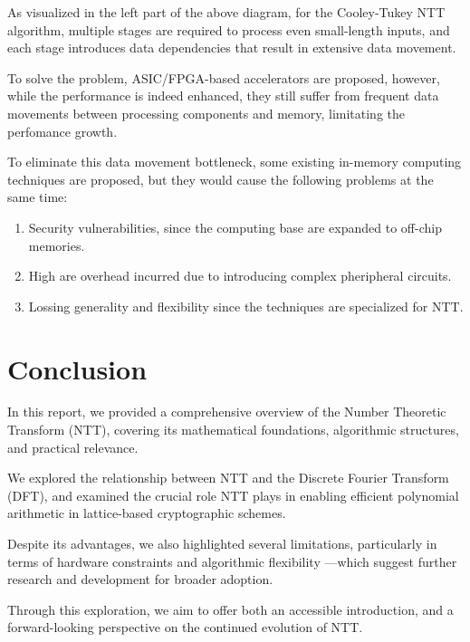 \documentclass[12pt]{article}
\begin{document}
As visualized in the left part of the above diagram, for the Cooley-Tukey NTT algorithm, 
multiple stages are required to process even small-length inputs, 
and each stage introduces data dependencies that result in extensive data movement. 

To solve the problem, ASIC/FPGA-based accelerators are proposed, 
however, while the performance is indeed enhanced, 
they still suffer from frequent data movements between processing components and memory, 
limitating the perfomance growth.
\cite{bp_ntt}

To eliminate this data movement bottleneck, 
some existing in-memory computing techniques are proposed, 
but they would cause the following problems at the same time:

\begin{enumerate}
    \item Security vulnerabilities, since the computing base are expanded to off-chip memories.
    \item High are overhead incurred due to introducing complex pheripheral circuits.
    \item Lossing generality and flexibility since the techniques are specialized for NTT.
\end{enumerate}
\cite{bp_ntt}

\section{Conclusion}

In this report, 
we provided a comprehensive overview of the Number Theoretic Transform (NTT), 
covering its mathematical foundations, algorithmic structures, and practical relevance. 

We explored the relationship between NTT and the Discrete Fourier Transform (DFT), 
and examined the crucial role NTT plays in enabling efficient polynomial arithmetic in lattice-based cryptographic schemes. 

Despite its advantages, we also highlighted several limitations, 
particularly in terms of hardware constraints and algorithmic flexibility
—which suggest further research and development for broader adoption. 

Through this exploration, 
we aim to offer both an accessible introduction, 
and a forward-looking perspective on the continued evolution of NTT.


 
\end{document}
